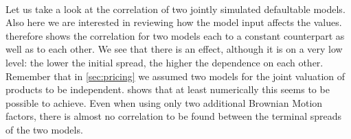 \documentclass[12pt]{article}
\begin{document}
	\\Let us take a look at the correlation of two jointly simulated defaultable models. Also here we are interested in reviewing how the model input affects the values.  therefore shows the correlation for two models each to a constant counterpart as well as to each other. We see that there is an effect, although it is on a very low level: the lower the initial spread, the higher the dependence on each other.\\
	Remember that in \cref{sec:pricing} we assumed two models for the joint valuation of products to be independent.  shows that at least numerically this seems to be possible to achieve. Even when using only two additional Brownian Motion factors, there is almost no correlation to be found between the terminal spreads of the two models.
	
\end{document}
